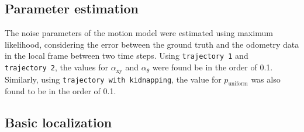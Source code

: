 \documentclass[letterpaper, 10pt, conference]{ieeeconf}
\begin{document}
\subsection{Parameter estimation}
\label{sec:mle}

The noise parameters of the motion model were estimated using maximum likelihood, considering the error between the ground truth and the odometry data in the local frame between two time steps.
Using \texttt{trajectory~1} and \texttt{trajectory~2}, the values for  $\alpha_\mathrm{xy}$ and $\alpha_\theta$ were found be in the order of 0.1.
Similarly, using \texttt{trajectory with kidnapping}, the value for $p_\mathrm{uniform}$ was also found to be in the order of 0.1.

\subsection{Basic localization}
\end{document}
